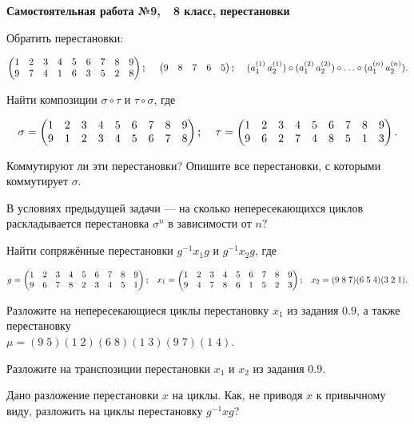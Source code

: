 {\noindent\bf Самостоятельная работа №9,\ \ 8 класс, перестановки}

\begin{itemize}
	\itm[$9$] Обратить перестановки: \vspace{-4mm}

		$$\begin{pmatrix}1 & 2 & 3 & 4 & 5 & 6 & 7 & 8 & 9 \\
			             9 & 7 & 4 & 1 & 6 & 3 & 5 & 2 & 8 \end{pmatrix}\scolon\ \ \ \ 
		\begin{pmatrix} 9&8&7&6&5 \end{pmatrix}\scolon\ \ \ \ 
		(a_1^{(1)}\,a_2^{(1)}) \circ (a_1^{(2)}\,a_2^{(2)}) \circ \ldots \circ (a_1^{(n)}\,a_2^{(n)}).$$
	\vspace{-4.5mm}

	\itm[$99$] Найти композиции $\sigma \circ \tau$ и $\tau \circ \sigma$, где\vspace{-4mm}

	$$\sigma = \begin{pmatrix} 1 & 2 & 3 & 4 & 5 & 6 & 7 & 8 & 9 \\
		9 & 1 & 2 & 3 & 4 & 5 & 6 & 7 & 8 \end{pmatrix}\scolon\ \ \ \ 
	\tau = \begin{pmatrix}1 & 2 & 3 & 4 & 5 & 6 & 7 & 8 & 9 \\
		9 & 6 & 2 & 7 & 4 & 8 & 5 & 1 & 3\end{pmatrix}.$$
	\vspace{-4.5mm}
	
Коммутируют ли эти перестановки? Опишите все перестановки, с которыми коммутирует $\sigma$.

	\itm[$99+9$] В условиях предыдущей задачи — на сколько непересекающихся циклов раскладывается перестановка $\sigma^n$ в зависимости от $n$?

	\itm[$0$.$9$] Найти сопряжённые перестановки $g^{-1}x_1g$ и $g^{-1}x_2g$, где\vspace{-7.5mm}
	
	$$g = \begin{pmatrix}1 & 2 & 3 & 4 & 5 & 6 & 7 & 8 & 9\\
		9&6&7&8&2&3&4&5&1\end{pmatrix}\scolon\ \ \ 
	x_1 = \begin{pmatrix}1 & 2 & 3 & 4 & 5 & 6 & 7 & 8 & 9\\
		9&4&7&8&6&1&5&2&3\end{pmatrix}\scolon\ \ \ 
	x_2=(9\;8\;7)(6\;5\;4)(3\;2\;1).$$
	\vspace{-5.5mm}
	
	\itm[$9^9$] Разложите на непересекающиеся циклы перестановку $x_1$ из задания $0.9$, а также перестановку \\ $\mu = (9\;5)(1\;2)(6\;8)(1\;3)(9\;7)(1\;4)$.

	\itm[$9\pm9$] Разложите на транспозиции перестановки $x_1$ и $x_2$ из задания 0.9.

	\itm[\it 9+\!+] Дано разложение перестановки $x$ на циклы. Как, не приводя $x$ к привычному виду, разложить на циклы перестановку $g^{-1} x g$?
	\itm[.]
\end{itemize}